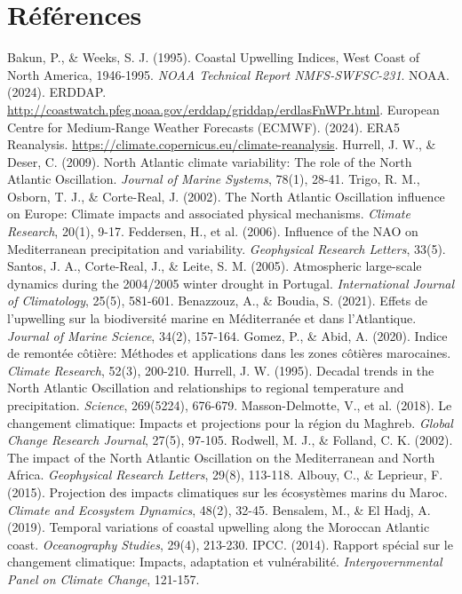 \section*{Références}
\begin{thebibliography}{99}
     Bakun, P., \& Weeks, S. J. (1995). Coastal Upwelling Indices, West Coast of North America, 1946-1995. \textit{NOAA Technical Report NMFS-SWFSC-231}.
     NOAA. (2024). ERDDAP. \url{http://coastwatch.pfeg.noaa.gov/erddap/griddap/erdlasFnWPr.html}.
     European Centre for Medium-Range Weather Forecasts (ECMWF). (2024). ERA5 Reanalysis. \url{https://climate.copernicus.eu/climate-reanalysis}.
     Hurrell, J. W., \& Deser, C. (2009). North Atlantic climate variability: The role of the North Atlantic Oscillation. \textit{Journal of Marine Systems}, 78(1), 28-41.
     Trigo, R. M., Osborn, T. J., \& Corte-Real, J. (2002). The North Atlantic Oscillation influence on Europe: Climate impacts and associated physical mechanisms. \textit{Climate Research}, 20(1), 9-17.
     Feddersen, H., et al. (2006). Influence of the NAO on Mediterranean precipitation and variability. \textit{Geophysical Research Letters}, 33(5).
     Santos, J. A., Corte-Real, J., \& Leite, S. M. (2005). Atmospheric large-scale dynamics during the 2004/2005 winter drought in Portugal. \textit{International Journal of Climatology}, 25(5), 581-601.
     Benazzouz, A., \& Boudia, S. (2021). Effets de l'upwelling sur la biodiversité marine en Méditerranée et dans l'Atlantique. \textit{Journal of Marine Science}, 34(2), 157-164.
     Gomez, P., \& Abid, A. (2020). Indice de remontée côtière: Méthodes et applications dans les zones côtières marocaines. \textit{Climate Research}, 52(3), 200-210.
     Hurrell, J. W. (1995). Decadal trends in the North Atlantic Oscillation and relationships to regional temperature and precipitation. \textit{Science}, 269(5224), 676-679.
     Masson-Delmotte, V., et al. (2018). Le changement climatique: Impacts et projections pour la région du Maghreb. \textit{Global Change Research Journal}, 27(5), 97-105.
     Rodwell, M. J., \& Folland, C. K. (2002). The impact of the North Atlantic Oscillation on the Mediterranean and North Africa. \textit{Geophysical Research Letters}, 29(8), 113-118.
     Albouy, C., \& Leprieur, F. (2015). Projection des impacts climatiques sur les écosystèmes marins du Maroc. \textit{Climate and Ecosystem Dynamics}, 48(2), 32-45.
     Bensalem, M., \& El Hadj, A. (2019). Temporal variations of coastal upwelling along the Moroccan Atlantic coast. \textit{Oceanography Studies}, 29(4), 213-230.
     IPCC. (2014). Rapport spécial sur le changement climatique: Impacts, adaptation et vulnérabilité. \textit{Intergovernmental Panel on Climate Change}, 121-157.
\end{thebibliography}
